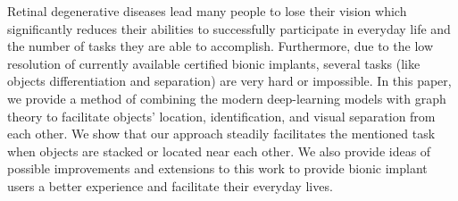 Retinal degenerative diseases lead many people to lose their vision which significantly reduces their abilities to successfully participate in everyday life and the number of tasks they are able to accomplish. Furthermore, due to the low resolution of currently available certified bionic implants, several tasks (like objects differentiation and separation) are very hard or impossible. In this paper, we provide a method of combining the modern deep-learning models with graph theory to facilitate objects' location, identification, and visual separation from each other. We show that our approach steadily facilitates the mentioned task when objects are stacked or located near each other. We also provide ideas of possible improvements and extensions to this work to provide bionic implant users a better experience and facilitate their everyday lives.